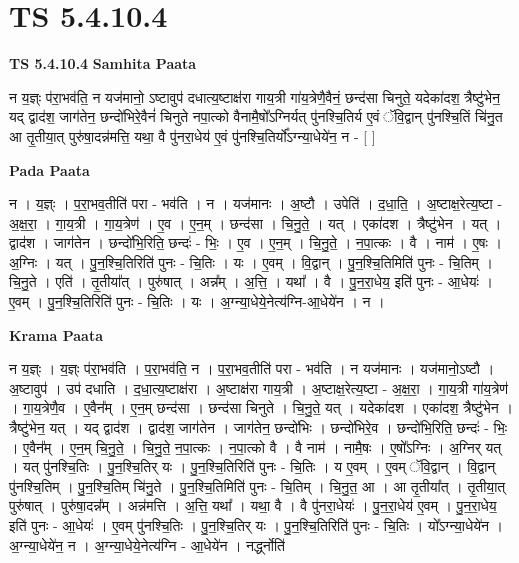 \documentclass[17pt]{extarticle}
\begin{document}
\section{ TS 5.4.10.4 }

\textbf{TS 5.4.10.4 } \newline
\textbf{Samhita Paata} \newline

न य॒ज्ञ्ः प॑रा॒भव॑ति॒ न यज॑मानो॒ ऽष्टावुप॑ दधात्य॒ष्टाक्ष॑रा गाय॒त्री गा॑य॒त्रेणै॒वैनं॒ छन्द॑सा चिनुते॒ यदेका॑दश॒ त्रैष्टु॑भेन॒ यद् द्वाद॑श॒ जाग॑तेन॒ छन्दो॑भिरे॒वैनं॑ चिनुते नपा॒त्को वैनामै॒षो᳚ऽग्निर्यत् पु॑नश्चि॒तिर्य ए॒वं ॅवि॒द्वान् पु॑नश्चि॒तिं चि॑नु॒त आ तृ॒तीया॒त् पुरु॑षा॒दन्न॑मत्ति॒ यथा॒ वै पु॑नरा॒धेय॑ ए॒वं पु॑नश्चि॒तिर्यो᳚ऽग्न्या॒धेये॑न॒ न - [  ] \newline

\textbf{Pada Paata} \newline

न । य॒ज्ञ्ः । प॒रा॒भव॒तीति॑ परा - भव॑ति । न । यज॑मानः । अ॒ष्टौ । उपेति॑ । द॒धा॒ति॒ । अ॒ष्टाक्ष॒रेत्य॒ष्टा - अ॒क्ष॒रा॒ । गा॒य॒त्री । गा॒य॒त्रेण॑ । ए॒व । ए॒न॒म् । छन्द॑सा । चि॒नु॒ते॒ । यत् । एका॑दश । त्रैष्टु॑भेन । यत् । द्वाद॑श । जाग॑तेन । छन्दो॑भि॒रिति॒ छन्दः॑ - भिः॒ । ए॒व । ए॒न॒म् । चि॒नु॒ते॒ । न॒पा॒त्कः । वै । नाम॑ । ए॒षः । अ॒ग्निः । यत् । पु॒न॒श्चि॒तिरिति॑ पुनः - चि॒तिः । यः । ए॒वम् । वि॒द्वान् । पु॒न॒श्चि॒तिमिति॑ पुनः - चि॒तिम् । चि॒नु॒ते । एति॑ । तृ॒तीया᳚त् । पुरु॑षात् । अन्न᳚म् । अ॒त्ति॒ । यथा᳚ । वै । पु॒न॒रा॒धेय॒ इति॑ पुनः - आ॒धेयः॑ । ए॒वम् । पु॒न॒श्चि॒तिरिति॑ पुनः - चि॒तिः । यः । अ॒ग्न्या॒धेये॒नेत्य॑ग्नि-आ॒धेये॑न । न ।  \newline


\textbf{Krama Paata} \newline

न य॒ज्ञ्ः । य॒ज्ञ्ः प॑रा॒भव॑ति । प॒रा॒भव॑ति॒ न । प॒रा॒भव॒तीति॑ परा - भव॑ति । न यज॑मानः । यज॑मानो॒ऽष्टौ । अ॒ष्टावुप॑ । उप॑ दधाति । द॒धा॒त्य॒ष्टाक्ष॑रा । अ॒ष्टाक्ष॑रा गाय॒त्री । अ॒ष्टाक्ष॒रेत्य॒ष्टा - अ॒क्ष॒रा॒ । गा॒य॒त्री गा॑य॒त्रेण॑ । गा॒य॒त्रेणै॒व । ए॒वैन᳚म् । ए॒न॒म् छन्द॑सा । छन्द॑सा चिनुते । चि॒नु॒ते॒ यत् । यदेका॑दश । एका॑दश॒ त्रैष्टु॑भेन । त्रैष्टु॑भेन॒ यत् । यद् द्वाद॑श । द्वाद॑श॒ जाग॑तेन । जाग॑तेन॒ छन्दो॑भिः । छन्दो॑भिरे॒व । छन्दो॑भि॒रिति॒ छन्दः॑ - भिः॒ । ए॒वैन᳚म् । ए॒न॒म् चि॒नु॒ते॒ । चि॒नु॒ते॒ न॒पा॒त्कः । न॒पा॒त्को वै । वै नाम॑ । नामै॒षः । ए॒षो᳚ऽग्निः । अ॒ग्निर् यत् । यत् पु॑नश्चि॒तिः । पु॒न॒श्चि॒तिर् यः । पु॒न॒श्चि॒तिरिति॑ पुनः - चि॒तिः । य ए॒वम् । ए॒वम् ॅवि॒द्वान् । वि॒द्वान् पु॑नश्चि॒तिम् । पु॒न॒श्चि॒तिम् चि॑नु॒ते । पु॒न॒श्चि॒तिमिति॑ पुनः - चि॒तिम् । चि॒नु॒त॒ आ । आ तृ॒तीया᳚त् । तृ॒तीया॒त् पुरु॑षात् । पुरु॑षा॒दन्न᳚म् । अन्न॑मत्ति । अ॒त्ति॒ यथा᳚ । यथा॒ वै । वै पु॑नरा॒धेयः॑ । पु॒न॒रा॒धेय॑ ए॒वम् । पु॒न॒रा॒धेय॒ इति॑ पुनः - आ॒धेयः॑ । ए॒वम् पु॑नश्चि॒तिः । पु॒न॒श्चि॒तिर् यः । पु॒न॒श्चि॒तिरिति॑ पुनः - चि॒तिः । यो᳚ऽग्न्या॒धेये॑न । अ॒ग्न्या॒धेये॑न॒ न । अ॒ग्न्या॒धेये॒नेत्य॑ग्नि - आ॒धेये॑न । नर्द्ध्नोति॑ \newline
\end{document}
